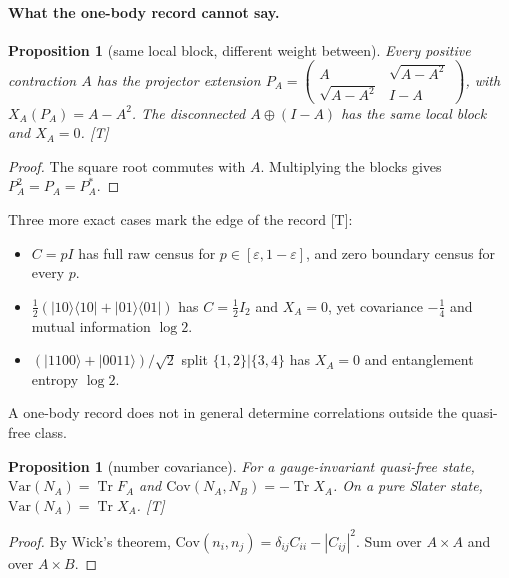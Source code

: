 \documentclass[11pt]{article}
\newtheorem{proposition}[theorem]{Proposition}
\theoremstyle{definition}
\newcommand{\grade}[1]{\textsf{\small[#1]}}
\newcommand{\Tr}{\operatorname{Tr}}
\begin{document}
\paragraph{What the one-body record cannot say.}
\begin{proposition}[same local block, different weight between]\label{prop:extension}
Every positive contraction $A$ has the projector extension $P_A=\begin{pmatrix}A&\sqrt{A-A^2}\\\sqrt{A-A^2}&I-A\end{pmatrix}$, with $X_A(P_A)=A-A^2$. The disconnected $A\oplus(I-A)$ has the same local block and $X_A=0$. \grade{T}
\end{proposition}
\begin{proof}
The square root commutes with $A$. Multiplying the blocks gives $P_A^2=P_A=P_A^*$.
\end{proof}
Three more exact cases mark the edge of the record \grade{T}:
\begin{itemize}
\item $C=pI$ has full raw census for $p\in[\varepsilon,1-\varepsilon]$, and zero boundary census for every $p$.
\item $\tfrac12(|10\rangle\langle10|+|01\rangle\langle01|)$ has $C=\tfrac12I_2$ and $X_A=0$, yet covariance $-\tfrac14$ and mutual information $\log2$.
\item $(|1100\rangle+|0011\rangle)/\sqrt2$ split $\{1,2\}|\{3,4\}$ has $X_A=0$ and entanglement entropy $\log2$.
\end{itemize}
A one-body record does not in general determine correlations outside the quasi-free class.

\begin{proposition}[number covariance]\label{prop:var}
For a gauge-invariant quasi-free state, $\mathrm{Var}(N_A)=\Tr F_A$ and $\mathrm{Cov}(N_A,N_B)=-\Tr X_A$. On a pure Slater state, $\mathrm{Var}(N_A)=\Tr X_A$. \grade{T}
\end{proposition}
\begin{proof}
By Wick's theorem, $\mathrm{Cov}(n_i,n_j)=\delta_{ij}C_{ii}-|C_{ij}|^2$. Sum over $A\times A$ and over $A\times B$.
\end{proof}
\end{document}
